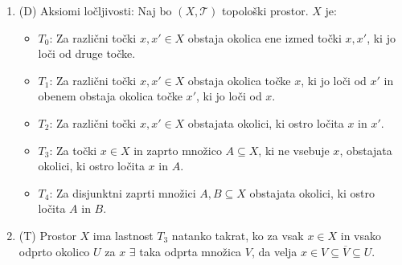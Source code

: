 \documentclass[10pt,a4paper]{article}
\newcommand{\TT}{\mathcal{T}}
\begin{document}
\begin{enumerate}
\item (D) Aksiomi ločljivosti: Naj bo $(X,\TT)$ topološki prostor. $X$ je: 
\vspace{-1mm}
\begin{itemize}
    \setlength\itemsep{-1mm}
    \item $T_0$: Za različni točki $x,x'\in X$ obstaja okolica ene izmed točki $x,x'$, ki jo loči od druge točke.
    \item $T_1$: Za različni točki $x,x'\in X$ obstaja okolica točke $x$, ki jo loči od $x'$ in obenem obstaja okolica točke $x'$, ki jo loči od $x$.
    \item $T_2$: Za različni točki $x,x'\in X$ obstajata okolici, ki ostro ločita $x$ in $x'$.
    \item $T_3$: Za točki $x\in X$ in zaprto množico $A\subseteq X$, ki ne vsebuje $x$, obstajata okolici, ki ostro ločita $x$ in $A$.
    \item $T_4$: Za disjunktni zaprti množici $A,B\subseteq X$ obstajata okolici, ki ostro ločita $A$ in $B$.
\end{itemize}
            

\item (T) Prostor $X$ ima lastnost $T_3$ natanko takrat, ko za vsak $x\in X$ in vsako odprto okolico $U$ za $x$ $\exists$ taka odprta množica $V$, da velja $x\in V\subseteq \overline{V}\subseteq U$.


            



\end{enumerate}
\end{document}
